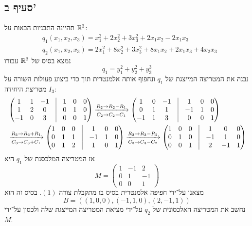 \subsection{סעיף ב'}
תהיינה התבניות הבאות על $\mathbb{R}^3$:
\begin{align*}
	& q_1(x_1, x_2, x_3) = x_1^2 + 2x_2^2 + 3x_3^2 + 2x_1x_2 - 2x_1x_3 \\
	& q_2(x_1, x_2, x_3) = 2x_1^2 + 8x_2^2 + 3x_3^2 + 8x_1x_2 + 2x_1x_3 + 4x_2x_3
\end{align*}
נמצא בסיס של $\mathbb{R}^3$ עבורו
\[
	q_1 = y_1^2 + y_2^2 + y_3^3 \tag{1}
\]
נבנה את המטריצה המייצגת של $q_1$ ונחפוף אותה אלמנטרית תוך כדי ביצוע פעולות השורה על מטריצת היחידה $I_3$:
\begin{align*}
	& \begin{pmatrix}
		1 & 1 & -1 & \vline & 1 & 0 & 0 \\
		1 & 2 & 0 & \vline & 0 & 1 & 0 \\
		-1 & 0 & 3 & \vline & 0 & 0 & 1
	\end{pmatrix}
	\xrightarrow[C_2 \to C_2 - C_1]{R_2 \to R_2 - R_1}
	\begin{pmatrix}
		1 & 0 & -1 & \vline & 1 & 0 & 0 \\
		0 & 1 & 1 & \vline & -1 & 1 & 0 \\
		-1 & 1 & 3 & \vline & 0 & 0 & 1
	\end{pmatrix} \\
	& \xrightarrow[C_3 \to C_3 + C_1]{R_3 \to R_3 + R_1}
	\begin{pmatrix}
		1 & 0 & 0 & \vline & 1 & 0 & 0 \\
		0 & 1 & 1 & \vline & -1 & 1 & 0 \\
		0 & 1 & 2 & \vline & 1 & 0 & 1
	\end{pmatrix}
	\xrightarrow[C_3 \to C_3 - C_2]{R_3 \to R_3 - R_2}
	\begin{pmatrix}
		1 & 0 & 0 & \vline & 1 & 0 & 0 \\
		0 & 1 & 0 & \vline & -1 & 1 & 0 \\
		0 & 0 & 1 & \vline & 2 & -1 & 1
	\end{pmatrix}
\end{align*}
אז המטריצה המלכסנת של $q_1$ היא
\[
	M = \begin{pmatrix} 1 & -1 & 2 \\
		0 & 1 & -1 \\
		0 & 0 & 1
	\end{pmatrix}
\]
מצאנו על־ידי חפיפה אלמנטרית בסיס בו מתקבלת צורה $(1)$. בסיס זה הוא
\[
	B = ((1, 0, 0), (-1, 1, 0), (2, -1, 1))
\]
נחשב את המטריצה האלכסונית של $q_2$ על־ידי מציאת המטריצה המייצגת שלה ולכסון על־ידי $M$.
